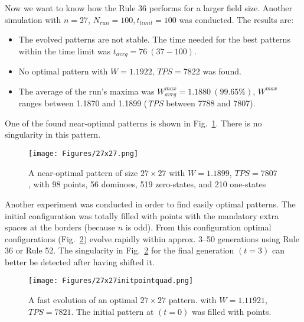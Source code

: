 \documentclass[10pt,a4paper]{article}  %
\begin{document}
Now we want to know how the Rule 36 performs for a larger field size. 
Another simulation with $n=27$, $N_{run}=100, t_{limit}=100$ was conducted.
The results are:

\begin{itemize}
  \item
  The evolved patterns are not stable.
  The  time needed for the best patterns within the time limit 
  was $t_{avrg}= 76 ~(37-100)$.  

	\item 
  No optimal pattern with $W=1.1922$, $\textit{TPS}=7822$ was found. 
  
  \item
   The average of the run's maxima was $W^{max}_{avrg}=1.1880 ~(99.65\%)$,
  $W^{max}$ ranges between 1.1870 and 1.1899 (\textit{TPS} between 7788 and 7807). %
  
\end{itemize}

One of the found near-optimal patterns is shown in Fig.~\ref{27x27}.
There is no singularity in this pattern. 


\begin{figure}[H] 
\centering
\texttt{[image: Figures/27x27.png]}	
\caption{
A near-optimal pattern of size $27 \times 27$ 
with  $W=1.1899$, $\textit{TPS}=7807$, 
with 98 points, 56 dominoes,
519 zero-states, and 210 one-states
}
\label{27x27}
\end{figure}

Another experiment was conducted in order to find easily optimal patterns.
The initial configuration was totally filled with points
with the mandatory extra spaces at the borders (because $n$ is odd).
From this configuration  optimal configurations (Fig.~\ref{27x27initpointquad}) 
 evolve rapidly within 
approx. 3--50 generations using Rule 36 or Rule 52. 
The singularity in 
Fig.~\ref{27x27initpointquad}
for the final generation $(t=3)$
can better be detected after having shifted it.

\begin{figure}[H] 
\centering
\texttt{[image: Figures/27x27initpointquad.png]}	
\caption{
A fast evolution of an optimal  $27 \times 27$ pattern.
with  $W=1.11921$, $\textit{TPS}=7821$. 
The initial pattern at $(t=0)$ was filled with points. 
}
\label{27x27initpointquad}
\end{figure}
   
\end{document}
